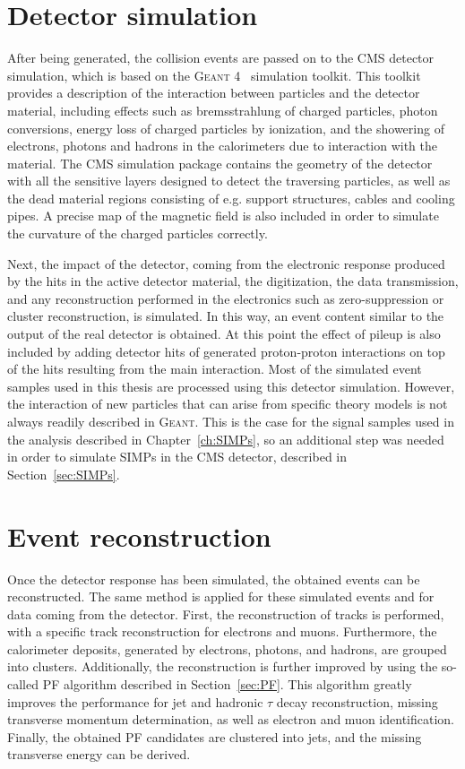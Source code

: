 \section{Detector simulation}
\label{sec:sim}

After being generated, the collision events are passed on to the \ac{CMS} detector simulation, which is based on the \textsc{Geant 4}~\cite{Allison:2006ve} simulation toolkit. This toolkit provides a description of the interaction between particles and the detector material, including effects such as bremsstrahlung of charged particles, photon conversions, energy loss of charged particles by ionization, and the showering of electrons, photons and hadrons in the calorimeters due to interaction with the material. The \ac{CMS} simulation package contains the geometry of the detector with all the sensitive layers designed to detect the traversing particles, as well as the dead material regions consisting of e.g. support structures, cables and cooling pipes. A precise map of the magnetic field is also included in order to simulate the curvature of the charged particles correctly.

Next, the impact of the detector, coming from the electronic response produced by the hits in the active detector material, the digitization, the data transmission, and any reconstruction performed in the electronics such as zero-suppression or cluster reconstruction, is simulated. In this way, an event content similar to the output of the real detector is obtained. At this point the effect of pileup is also included by adding detector hits of generated proton-proton interactions on top of the hits resulting from the main interaction. Most of the simulated event samples used in this thesis are processed using this detector simulation. However, the interaction of new particles that can arise from specific theory models is not always readily described in \textsc{Geant}. This is the case for the signal samples used in the analysis described in Chapter~\ref{ch:SIMPs}, so an additional step was needed in order to simulate \acfp{SIMP} in the \ac{CMS} detector, described in Section~\ref{sec:SIMPs}. 

\section{Event reconstruction}
\label{sec:reconstruction}

Once the detector response has been simulated, the obtained events can be reconstructed. The same method is applied for these simulated events and for data coming from the detector. First, the reconstruction of tracks is performed, with a specific track reconstruction for electrons and muons. Furthermore, the calorimeter deposits, generated by electrons, photons, and hadrons, are grouped into clusters. Additionally, the reconstruction is further improved by using the so-called \acf{PF} algorithm described in Section~\ref{sec:PF}. This algorithm greatly improves the performance for jet and hadronic $\tau$ decay reconstruction, missing transverse momentum determination, as well as electron and muon identification. Finally, the obtained \ac{PF} candidates are clustered into jets, and the missing transverse energy can be derived.

